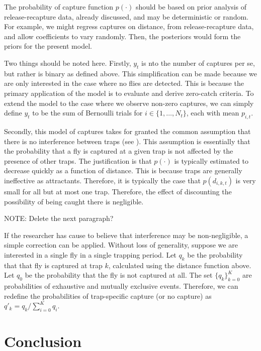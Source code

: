 \documentclass[
  oneside]{book}
\begin{document}
The probability of capture function \(p(\cdot)\) should be based on prior analysis of release-recapture data, already discussed, and may be deterministic or random. For example, we might regress captures on distance, from release-recapture data, and allow coefficients to vary randomly. Then, the posteriors would form the priors for the present model.

Two things should be noted here. Firstly, \(y_t\) is nto the number of captures per se, but rather is binary as defined above. This simplification can be made because we are only interested in the case where no flies are detected. This is because the primary application of the model is to evaluate and derive zero-catch criteria. To extend the model to the case where we observe non-zero captures, we can simply define \(y_t\) to be the sum of Bernoulli trials for \(i \in \{1, \ldots, N_t\}\), each with mean \(p_{i,t}\).

Secondly, this model of captures takes for granted the common assumption that there is no interference between traps (see \citet{todocite}). This assumption is essentially that the probability that a fly is captured at a given trap is not affected by the presence of other traps. The justification is that \(p(\cdot)\) is typically estimated to decrease quickly as a function of distance. This is because traps are generally ineffective as attractants. Therefore, it is typically the case that \(p(d_{i, k, t})\) is very small for all but at most one trap. Therefore, the effect of discounting the possibility of being caught there is negligible.

NOTE: Delete the next paragraph?

If the researcher has cause to believe that interference may be non-negligible, a simple correction can be applied. Without loss of generality, suppose we are interested in a single fly in a single trapping period. Let \(q_k\) be the probability that that fly is captured at trap \(k\), calculated using the distance function above. Let \(q_0\) be the probability that the fly is not captured at all. The set \(\{q_k\}_{k=0}^K\) are probabilities of exhaustive and mutually exclusive events. Therefore, we can redefine the probabilities of trap-specific capture (or no capture) as \(q'_k = q_k / \sum_{i=0}^K q_i\).

\hypertarget{conclusion-1}{%
\section{Conclusion}\label{conclusion-1}}
\end{document}

